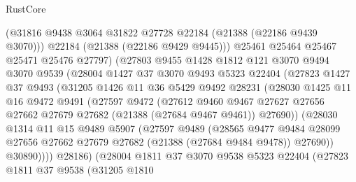 \begin{lexlean}{RustCore}
\begin{coremodule}
                  (@31816 @9438 @3064 @31822 @27728 @22184 (@21388 (@22186 @9439 @3070)))
                  @22184
                  (@21388 (@22186 @9429 @9445)))
                @25461
                @25464
                @25467
                @25471
                @25476
                @27797)
              (@27803
                @9455
                @1428
                @1812
                @121
                @3070
                @9494
                @3070
                @9539
                (@28004
                  @1427
                  @37
                  @3070
                  @9493
                  @5323
                  @22404
                  (@27823
                    @1427
                    @37
                    @9493
                    (@31205
                      @1426
                      @11
                      @36
                      @5429
                      @9492
                      @28231
                      (@28030
                        @1425
                        @11
                        @16
                        @9472
                        @9491
                        (@27597
                          @9472
                          (@27612
                            @9460
                            @9467
                            @27627
                            @27656
                            @27662
                            @27679
                            @27682
                            (@21388 (@27684 @9467 @9461))
                            @27690))
                        (@28030
                          @1314
                          @11
                          @15
                          @9489
                          @5907
                          (@27597
                            @9489
                            (@28565
                              @9477
                              @9484
                              @28099
                              @27656
                              @27662
                              @27679
                              @27682
                              (@21388 (@27684 @9484 @9478))
                              @27690))
                          @30890))))
                  @28186)
                (@28004
                  @1811
                  @37
                  @3070
                  @9538
                  @5323
                  @22404
                  (@27823
                    @1811
                    @37
                    @9538
                    (@31205
                      @1810

\end{coremodule}
\end{lexlean}
